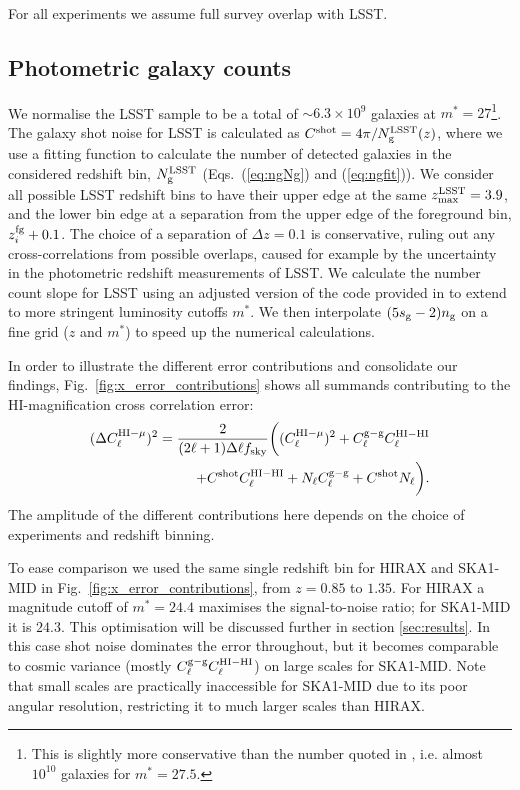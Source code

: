 \documentclass[useAMS,usenatbib]{mnras}
\begin{document}
For all experiments we assume full survey overlap with LSST.
\subsection{Photometric galaxy counts}
\label{ssec:photo}


We normalise the LSST sample to be a total of $\sim 6.3\times 10^9$ galaxies at $m^*=27$\footnote{This is slightly more conservative than the number quoted in \citet{2009arXiv0912.0201L}, i.e. almost $10^{10}$ galaxies for $m^*=27.5$.}.
The galaxy shot noise for LSST is calculated as $C^\mathrm{shot} = 4\pi/N_{\rm g}^{\rm LSST}(z)$, where we use a fitting function to calculate the number of detected galaxies in the considered redshift bin, $N_{\rm g}^{\rm LSST}$ (Eqs.~(\ref{eq:ngNg}) and (\ref{eq:ngfit})). We consider all possible LSST redshift bins to have their upper edge at the same $z_{\rm max}^{\rm LSST} = 3.9$, and the lower bin edge at a separation from the upper edge of the foreground bin, $z^{\rm fg}_i + 0.1$. The choice of a separation of $\Delta z = 0.1$ is conservative, ruling out any cross-correlations from possible overlaps, caused for example by the uncertainty in the photometric redshift measurements of LSST. We calculate the number count slope for LSST using an adjusted version of the code provided in \cite{0004-637X-814-2-145} to extend to more stringent luminosity cutoffs $m^*$. We then interpolate $(5s_{\rm g}-2)n_{\rm g}$ on a fine grid ($z$ and $m^*$) to speed up the numerical calculations.

In order to illustrate the different error contributions and consolidate our findings, Fig.~\ref{fig:x_error_contributions} shows all summands contributing to the HI-magnification cross correlation error:
\begin{align}
  (\Delta C_\ell^{{\rm HI-}\mu})^2 = \frac{2}{ (2\ell+1)\Delta\ell f_{\rm sky}} \biggl(   (C_\ell^{{\rm HI-}\mu})^2  + C_\ell^{\rm g-g}C_\ell^{\rm HI-HI}  \nonumber \\
  +  C^{\rm shot}C_\ell^{\rm HI-HI} + N_\ell C_\ell^{\rm g-g} +  C^{\rm shot}N_\ell \biggr).
  \label{eq:deltah-mu}
\end{align}
The amplitude of the different contributions here depends on the choice of experiments and redshift binning.

To ease comparison we used the same single redshift bin for HIRAX and SKA1-MID in Fig.~\ref{fig:x_error_contributions}, from $z=0.85$ to $1.35$. For HIRAX a magnitude cutoff of $m^* = 24.4$ maximises the signal-to-noise ratio; for SKA1-MID it is $24.3$. This optimisation will be discussed further in section \ref{sec:results}.
In this case shot noise dominates the error throughout, but it becomes comparable to cosmic variance (mostly $C_\ell^{\rm g-g}C_\ell^{\rm HI-HI}$) on large scales for SKA1-MID. Note that small scales are practically inaccessible for SKA1-MID due to its poor angular resolution, restricting it to much larger scales than HIRAX.
\end{document}
